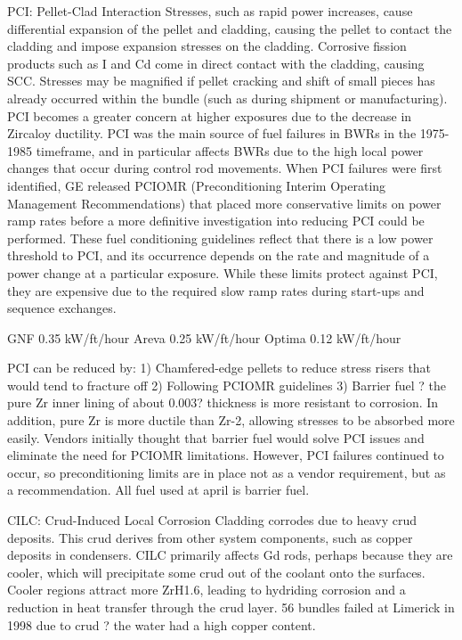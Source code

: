 \documentclass[10pt]{article}
\begin{document}
PCI: Pellet-Clad Interaction
Stresses, such as rapid power increases, cause differential expansion of the pellet and cladding, causing the pellet to contact the cladding and impose expansion stresses on the cladding. Corrosive fission products such as I and Cd come in direct contact with the cladding, causing SCC. Stresses may be magnified if pellet cracking and shift of small pieces has already occurred within the bundle (such as during shipment or manufacturing). PCI becomes a greater concern at higher exposures due to the decrease in Zircaloy ductility. PCI was the main source of fuel failures in BWRs in the 1975-1985 timeframe, and in particular affects BWRs due to the high local power changes that occur during control rod movements. When PCI failures were first identified, GE released PCIOMR (Preconditioning Interim Operating Management Recommendations) that placed more conservative limits on power ramp rates before a more definitive investigation into reducing PCI could be performed. These fuel conditioning guidelines reflect that there is a low power threshold to PCI, and its occurrence depends on the rate and magnitude of a power change at a particular exposure. While these limits protect against PCI, they are expensive due to the required slow ramp rates during start-ups and sequence exchanges. 

GNF
0.35 kW/ft/hour
Areva
0.25 kW/ft/hour
Optima
0.12 kW/ft/hour

PCI can be reduced by:
1)	Chamfered-edge pellets to reduce stress risers that would tend to fracture off
2)	Following PCIOMR guidelines
3)	Barrier fuel ? the pure Zr inner lining of about 0.003? thickness is more resistant to corrosion. In addition, pure Zr is more ductile than Zr-2, allowing stresses to be absorbed more easily. Vendors initially thought that barrier fuel would solve PCI issues and eliminate the need for PCIOMR limitations. However, PCI failures continued to occur, so preconditioning limits are in place not as a vendor requirement, but as a recommendation. All fuel used at april is barrier fuel. 

CILC: Crud-Induced Local Corrosion
Cladding corrodes due to heavy crud deposits. This crud derives from other system components, such as copper deposits in condensers. CILC primarily affects Gd rods, perhaps because they are cooler, which will precipitate some crud out of the coolant onto the surfaces. Cooler regions attract more ZrH1.6, leading to hydriding corrosion and a reduction in heat transfer through the crud layer. 56 bundles failed at Limerick in 1998 due to crud ? the water had a high copper content. 
\end{document}
